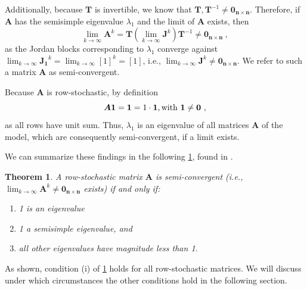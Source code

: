 \documentclass[journal,compsoc,10pt]{IEEEtran}
\renewcommand{\vec}[1]{\bm{#1}}        %
\newcommand{\mat}[1]{\bm{#1}}          %
\newcommand{\ones}{\bm{1}}             %
\newcommand{\zeros}{\bm{0}}             %
\newcommand{\zerosmatr}{\bm{0_{n\times n}}}
\newtheorem{theorem}{Theorem}[section]
\newtheorem{lemma}{Lemma}[section]
\begin{document}
Additionally, because $\mat T$ is invertible, we know that $\mat T,\mat T^{-1}\neq \zerosmatr$. Therefore, if $\mat A$ has the semisimple eigenvalue $\lambda_1$ and the limit of $\mat A$ exists, then 
\[\lim_{k\rightarrow\infty}\mat{A}^k = \mat T(\lim_{k\rightarrow\infty}\mat{J}^k)\mat T^{-1} \neq \zerosmatr \ ,\] 
as the Jordan blocks corresponding to $\lambda_1$ converge against $\lim_{k\rightarrow\infty}{\mat{J_1}^k} = \lim_{k\rightarrow\infty}{[1]^k} = [1]$, i.e., $\lim_{k\rightarrow\infty}\mat J^k \neq \zerosmatr$. We refer to such a matrix $\mat A$ as semi-convergent.

Because $\mat A$ is row-stochastic, by definition
\begin{equation}\label{eq:1_eigenvalue_all_row_stochastic_mat}
    \mat A\ones= \ones = 1\cdot\ones, \textnormal{with } \ones \neq \zeros\ ,
\end{equation}
as all rows have unit sum. Thus, $\lambda_1$ is an eigenvalue of all matrices $\mat A$ of the model, which are consequently semi-convergent, if a limit exists.

We can summarize these findings in the following \cref{th:semi_conv}, found in \cite{Bullo_lecture}.
\begin{theorem}\label{th:semi_conv}
    A row-stochastic matrix $\mat A$ is semi-convergent (i.e., $\lim_{k\rightarrow\infty}\mat A^k \neq \zerosmatr$ exists) if and only if:
    \begin{enumerate}[label=(\roman*)]
        \item 1 is an eigenvalue
        \item 1 a semisimple eigenvalue, and
        \item all other eigenvalues have magnitude less than 1. 
    \end{enumerate}
\end{theorem}
As shown, condition (i) of \cref{th:semi_conv} holds for all row-stochastic matrices. We will discuss under which circumstances the other conditions hold in the following section.

\end{document}
